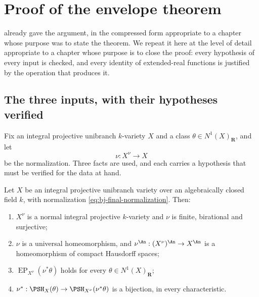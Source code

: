 \section{Proof of the envelope theorem}
\label{sec:ch45-proof}

 already gave the argument, in the
compressed form appropriate to a chapter whose purpose was to state the
theorem.  We repeat it here at the level of detail appropriate to a chapter
whose purpose is to close the proof: every hypothesis of every input is
checked, and every identity of extended-real functions is justified by the
operation that produces it.

\subsection{The three inputs, with their hypotheses verified}
\label{sec:ch45-three-inputs}

Fix an integral projective unibranch $k$-variety $X$ and a class
$\theta\in N^1(X)_{\mathbf R}$, and let
\[
                         \nu:X^\nu\longrightarrow X
\tag{45.2}\label{eq:bj-final-normalization}
\]
be the normalization.  Three facts are used, and each carries a hypothesis
that must be verified for the data at hand.

\begin{lemma}
\label{lem:ch45-normalization-data}
Let $X$ be an integral projective unibranch variety over an algebraically
closed field $k$, with normalization \eqref{eq:bj-final-normalization}.
Then:
\begin{enumerate}
\item\label{itm:ch45-nd:normal}
      $X^\nu$ is a normal integral projective $k$-variety and $\nu$ is
      finite, birational and surjective;
\item\label{itm:ch45-nd:uh}
      $\nu$ is a universal homeomorphism, and
      $\nu^{\An}:(X^\nu)^{\An}\to X^{\An}$ is a homeomorphism of compact
      Hausdorff spaces;
\item\label{itm:ch45-nd:ep}
      $\operatorname{EP}_{X^\nu}(\nu^*\theta)$ holds for every
      $\theta\in N^1(X)_{\mathbf R}$;
\item\label{itm:ch45-nd:refl}
      $\nu^*:\PSH_X(\theta)\to\PSH_{X^\nu}(\nu^*\theta)$ is a bijection,
      in every characteristic.
\end{enumerate}
\end{lemma}

